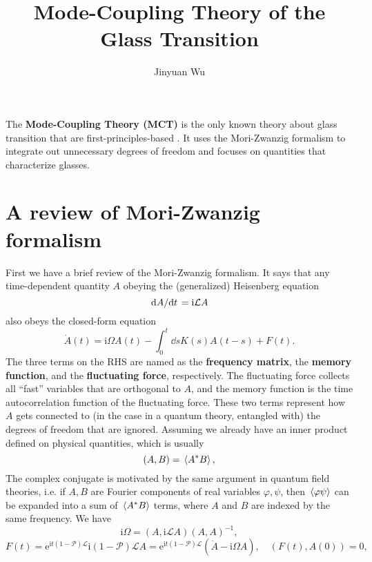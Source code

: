 \documentclass[hyperref, a4paper]{article}
\title{Mode-Coupling Theory of the Glass Transition}
\author{Jinyuan Wu}
\newcommand*{\ii}{\mathrm{i}}
\newcommand*{\ee}{\mathrm{e}}
\newcommand*{\concept}[1]{{\textbf{#1}}}
\begin{document}
\maketitle

The \concept{Mode-Coupling Theory (MCT)} is the only known theory about glass transition that are
first-principles-based \cite{mct2005,mct-primer}. It uses the Mori-Zwanzig formalism 
\cite{MoriZwanzigformalismWikipedia} to integrate out unnecessary degrees of freedom and focuses 
on quantities that characterize glasses.

\section{A review of Mori-Zwanzig formalism}

First we have a brief review of the Mori-Zwanzig formalism. 
It says that any time-dependent quantity $A$ obeying the (generalized) Heisenberg equation 
\begin{equation}
    \dv*{A}{t} = \ii \mathcal{L} A
\end{equation}
also obeys the closed-form equation
\begin{equation}
    {\dot {A}}(t)= \ii \Omega A(t) - \int _{0}^{t} \dd{s} K(s)A(t-s)+F(t).
    \label{eq:closed-form-a}
\end{equation}
The three terms on the RHS are named as the \concept{frequency matrix}, the \concept{memory function}, 
and the \concept{fluctuating force}, respectively. The fluctuating force collects all ``fast'' variables that 
are orthogonal to $A$, and the memory function is the time autocorrelation function of the fluctuating force.
These two terms represent how $A$ gets connected to (in the case in a quantum theory, entangled with) the degrees of
freedom that are ignored. 
Assuming we already have an inner product defined on physical quantities, which is usually 
\begin{equation}
    (A, B) = \expval*{A^* B},
    \label{eq:inner-product-def}
\end{equation}
The complex conjugate is motivated by the same argument in quantum field theories, i.e. if $A, B$ are Fourier 
components of real variables $\varphi, \psi$, then $\expval*{\varphi \psi}$ can be expanded into a sum of 
$\expval*{A^* B}$ terms, where $A$ and $B$ are indexed by the same frequency.
We have 
\begin{equation}
    \ii \Omega =(A, \ii \mathcal{L} A)(A,A)^{-1},
\end{equation}
\begin{equation}
    F(t)= \ee^{\ii t(1-\mathcal{P}) \mathcal{L}}\ii (1-\mathcal{P}) \mathcal{L} A
    = \ee^{\ii t(1-\mathcal{P}) \mathcal{L}} (\dot{A} - \ii \Omega A), \quad (F(t), A(0)) = 0,
\end{equation}
\end{document}
